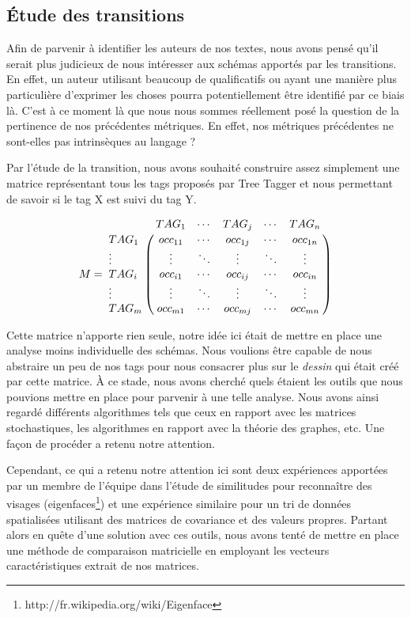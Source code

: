 \documentclass[a4paper,12pt]{report}
\begin{document}




\subsection{Étude des transitions}

Afin de parvenir à identifier les auteurs de nos textes, nous avons pensé qu'il serait plus judicieux de nous intéresser aux schémas apportés par les transitions. En effet, un auteur utilisant beaucoup de qualificatifs ou ayant une manière plus particulière d'exprimer les choses pourra potentiellement être identifié par ce biais là. C'est à ce moment là que nous nous sommes réellement posé la question de la pertinence de nos précédentes métriques. En effet, nos métriques précédentes ne sont-elles pas intrinsèques au langage ?

Par l'étude de la transition, nous avons souhaité construire assez simplement une matrice représentant tous les tags proposés par Tree Tagger et nous permettant de savoir si le tag X est suivi du tag Y.

\[M=\bordermatrix{
&TAG_{1}&\cdots&TAG_{j}&\cdots&TAG_{n}\cr
TAG_{1}& occ_{11} & \cdots & occ_{1j} & \cdots & occ_{1n} \cr
\vdots&\vdots&\ddots&\vdots&\ddots&\vdots\cr
TAG_{i}& occ_{i1} & \cdots & occ_{ij} & \cdots & occ_{in} \cr
\vdots&\vdots&\ddots&\vdots&\ddots&\vdots\cr
TAG_{m}& occ_{m1} & \cdots & occ_{mj} & \cdots & occ_{mn} \cr
}\]

Cette matrice n'apporte rien seule, notre idée ici était de mettre en place une analyse moins individuelle des schémas. Nous voulions être capable de nous abstraire un peu de nos tags pour nous consacrer plus sur le \textit{dessin} qui était créé par cette matrice. À ce stade, nous avons cherché quels étaient les outils que nous pouvions mettre en place pour parvenir à une telle analyse. Nous avons ainsi regardé différents algorithmes tels que ceux en rapport avec les matrices stochastiques, les algorithmes en rapport avec la théorie des graphes, etc. Une façon de procéder a retenu notre attention.

Cependant, ce qui a retenu notre attention ici sont deux expériences apportées par un membre de l'équipe dans l'étude de similitudes pour reconnaître des visages (eigenfaces\footnote{http://fr.wikipedia.org/wiki/Eigenface}) et une expérience similaire pour un tri de données spatialisées utilisant des matrices de covariance et des valeurs propres. Partant alors en quête d'une solution avec ces outils, nous avons tenté de mettre en place une méthode de comparaison matricielle en employant les vecteurs caractéristiques extrait de nos matrices.
\end{document}
